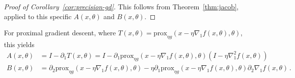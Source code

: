 \documentclass{article}
\def\prox{{\text{prox}}}
\begin{document}
\begin{proof}[Proof of Corollary~\ref{cor:precision-gd}]
This follows from Theorem~\ref{thm:jacob}, applied to this specific $A(x, \theta)$ and $B(x, \theta)$. 
%    
\end{proof}

For proximal gradient descent, where 
$T(x, \theta) = \prox_{\eta g}(x - \eta \nabla_1 f(x, \theta), \theta)$,
this yields
\begin{align*}
A(x, \theta) &= I - \partial_1 T(x, \theta) = 
I - 
\partial_1 \prox_{\eta g}(x - \eta \nabla_1 f(x, \theta), \theta )
(I - \eta \nabla_1^2 f(x, \theta)) 
\\
B(x, \theta) &= 
\partial_2 \prox_{\eta g}(x - \eta \nabla_1 f(x, \theta) , \theta) -
\eta 
\partial_1 \prox_{\eta g}(x - \eta \nabla_1 f(x, \theta) , \theta)
\partial_2 \nabla_1 f(x, \theta) 
\, .
\end{align*}
\end{document}
